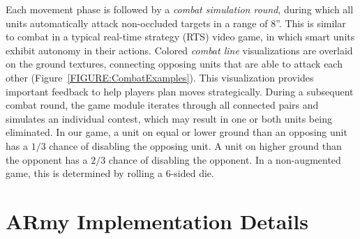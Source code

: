 \documentclass[10pt,twocolumn,letterpaper]{article}
\begin{document}
Each movement phase is followed by a \emph{combat simulation round},
during which all units automatically attack non-occluded targets in a
range of 8''.  
This is
similar to combat in a typical real-time strategy (RTS)
video game, in which smart units exhibit
autonomy in their actions.
%
%
Colored {\em combat line} visualizations are overlaid on the ground
textures, connecting opposing units that are able to attack each other
(Figure~\ref{FIGURE:CombatExamples}).  This visualization provides
important feedback to help players plan moves strategically.  During a
subsequent combat round, the game module iterates through all 
connected pairs and 
simulates an individual contest,
which may result in one or both units being eliminated.  In our game,
a unit on equal or lower ground than an opposing unit has a $1/3$
chance of disabling the opposing unit. A unit on higher ground than
the opponent has a $2/3$ chance of disabling the opponent. In a
non-augmented game, this is determined by rolling a 6-sided die.  

\section{ARmy Implementation Details}


\end{document}
